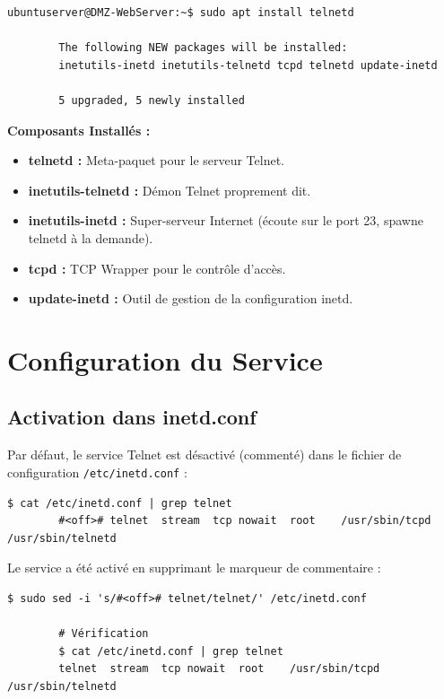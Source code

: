 \documentclass[12pt,a4paper,openany]{report}
\begin{document}
	\begin{lstlisting}[caption=Installation de Telnet Server]
		ubuntuserver@DMZ-WebServer:~$ sudo apt install telnetd
		
		The following NEW packages will be installed:
		inetutils-inetd inetutils-telnetd tcpd telnetd update-inetd
		
		5 upgraded, 5 newly installed
	\end{lstlisting}
	
	\textbf{Composants Installés :}
	\begin{itemize}
		\item \textbf{telnetd :} Meta-paquet pour le serveur Telnet.
		\item \textbf{inetutils-telnetd :} Démon Telnet proprement dit.
		\item \textbf{inetutils-inetd :} Super-serveur Internet (écoute sur le port 23, spawne telnetd à la demande).
		\item \textbf{tcpd :} TCP Wrapper pour le contrôle d'accès.
		\item \textbf{update-inetd :} Outil de gestion de la configuration inetd.
	\end{itemize}
	
	\section{Configuration du Service}
	
	\subsection{Activation dans inetd.conf}
	Par défaut, le service Telnet est désactivé (commenté) dans le fichier de configuration \texttt{/etc/inetd.conf} :
	
	\begin{lstlisting}[caption=Configuration par défaut (désactivée)]
		$ cat /etc/inetd.conf | grep telnet
		#<off># telnet	stream	tcp	nowait	root	/usr/sbin/tcpd	/usr/sbin/telnetd
	\end{lstlisting}
	
	Le service a été activé en supprimant le marqueur de commentaire :
	
	\begin{lstlisting}[caption=Activation du service Telnet]
		$ sudo sed -i 's/#<off># telnet/telnet/' /etc/inetd.conf
		
		# Vérification
		$ cat /etc/inetd.conf | grep telnet
		telnet	stream	tcp	nowait	root	/usr/sbin/tcpd	/usr/sbin/telnetd
	\end{lstlisting}
	
\end{document}
